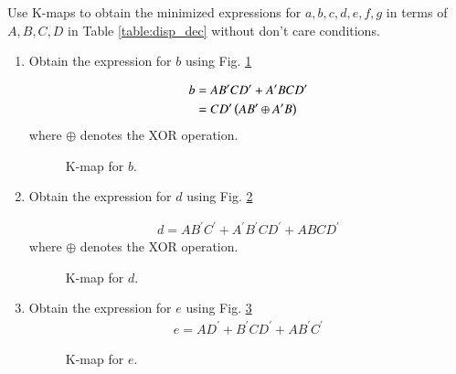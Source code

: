 Use K-maps to obtain the minimized expressions for 
$a,b,c,d,e,f,g$ in terms of $A,B,C,D$ in Table \ref{table:disp_dec} 
without don't care conditions.

\renewcommand{\theequation}{\theenumi}
\renewcommand{\thefigure}{\theenumi}
\begin{enumerate}[label=\thesubsection.\arabic*.,ref=\thesubsection.\theenumi]

\item Obtain the expression for $b$ using Fig. \ref{fig:disp_kmap_b}


\solution

\begin{align}
\label{eq:kmap_disp_b}
b &= A B^{\prime}C D^{\prime} + A^{\prime}B C D^{\prime}
\\
&=C D^{\prime}\left(A B^{\prime} \oplus A^{\prime}B\right)
\end{align}
%
where $\oplus$ denotes the XOR operation.
\begin{figure}[!ht]
\centering
\resizebox{\columnwidth}{!} {

}
\caption{K-map for $b$.}
\label{fig:disp_kmap_b}
\end{figure}
%
\item Obtain the expression for $d$ using Fig. \ref{fig:disp_kmap_d}
\solution


\begin{align}
\label{eq:kmap_disp_d}
d=AB^{\prime}C^{\prime}+A^{\prime}B^{\prime}CD^{\prime}+ABCD^{\prime}
\end{align}
%
where $\oplus$ denotes the XOR operation.
\begin{figure}[!ht]
\centering
\resizebox{\columnwidth}{!} {

}
\caption{K-map for $d$.}
\label{fig:disp_kmap_d}
\end{figure}
\item Obtain the expression for $e$ using Fig. \ref{fig:disp_kmap_e}
%
\begin{align}
\label{eq:kmap_disp_e}
e=AD^{\prime}+B^{\prime}CD^{\prime}+AB^{\prime}C^{\prime}
\end{align}
%
\begin{figure}[!ht]
\centering
\resizebox{\columnwidth}{!} {

}
\caption{K-map for $e$.}
\label{fig:disp_kmap_e}
\end{figure}

%
\end{enumerate}
%
%

